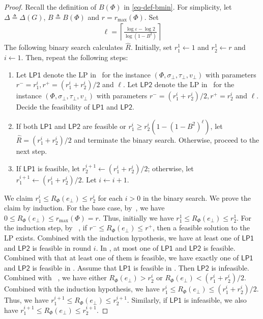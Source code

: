 \documentclass[11pt]{article}
\newcommand{\wh}[1]{\widehat{#1}}
\begin{document}
\begin{proof}
    Recall the definition of $B(\Phi)$ in \eqref{eq-def-bmin}.
    For simplicity, let $\Delta \triangleq \Delta(G)$, $B \triangleq B(\Phi)$ and $r=r_{\max}(\Phi)$. Set
     \begin{align}\label{eq-def-ell}
    \ell = \left\lceil \frac{\log{\varepsilon} - \log 2}{\log\left(1 - B^2\right)} \right\rceil
    \end{align}
    The following binary search calculates $\wh{R}$. Initially, set $r^1_1 \gets 1$ and $r^1_2 \gets r$ and $i \gets 1$. Then, repeat the following steps: 
    \begin{enumerate}[(1)]
        \item Let $\mathsf{LP1}$ denote the LP in~ for the instance $(\Phi, \sigma_\bot, \tau_\bot, v_\bot)$ with parameters $r^- = r^i_1,r^+ = (r^i_1 + r^i_2)/2$ and $\ell$.
        Let $\mathsf{LP2}$ denote the LP in~ for the instance $(\Phi, \sigma_\bot, \tau_\bot, v_\bot)$ with parameters $r^- = (r^i_1+r^i_2)/2,r^+ = r^i_2$ and $\ell$.
        Decide the feasibility of $\mathsf{LP1}$ and $\mathsf{LP2}$.
        \item If both $\mathsf{LP1}$ and $\mathsf{LP2}$ are feasible or $r^i_1 \geq r^i_2\left(1 - \left(1 - B^2\right)^{\ell}\right)$, let $\wh{R} = (r^i_1+r^i_2)/2$ and
        terminate the binary search. Otherwise, proceed to the next step. \label{enu-bs-2}
        \item If $\mathsf{LP1}$ is feasible, let $r^{i+1}_2 \leftarrow (r^i_1 + r^i_2)/2$; otherwise, let $r^{i+1}_1 \leftarrow (r^i_1 + r^i_2)/2$. Let $i \leftarrow i+1$.
        \label{enu-bs-3}
    \end{enumerate}
    We claim $r^i_1 \leq R_\Phi(e_\bot) \leq r^i_2$ for each $i>0$ in the binary search.
    We prove the claim by induction.
    For the base case, by~, 
    we have $0\leq R_{\Phi}(e_\bot)\leq r_{\max}(\Phi) = r$.
    Thus, initially we have $r^1_1 \leq R_\Phi(e_\bot) \leq r^1_2$.
    For the induction step, by ~, if $r^- \le R_\Phi(e_\bot) \le r^+$, then a feasible solution to the LP exists.
    Combined with the induction hypothesis, we have 
    at least one of $\mathsf{LP1}$ and $\mathsf{LP2}$ is feasible in round $i$.
    In , at most one of $\mathsf{LP1}$ and $\mathsf{LP2}$ is feasible. 
    Combined with that at least one of them is feasible,     
    we have exactly one of $\mathsf{LP1}$ and $\mathsf{LP2}$ is feasible in .
    Assume that $\mathsf{LP1}$ is feasible in .
    Then $\mathsf{LP2}$ is infeasible.
    Combined with ~, we have 
    either $R_\Phi(e_\bot) > r^i_2$ or $R_\Phi(e_\bot) < (r^i_1 + r^i_2)/2$. Combined with the induction hypothesis,
    we have $r^i_1 \leq R_\Phi(e_\bot) \leq (r^i_1 + r^i_2)/2$.
    Thus, we have $r^{i+1}_1 \leq R_\Phi(e_\bot) \leq r^{i+1}_2$. 
    Similarly, if $\mathsf{LP1}$ is infeasible,
    we also have $r^{i+1}_1 \leq R_\Phi(e_\bot) \leq r^{i+1}_2$.
    

\end{proof}
\end{document}

